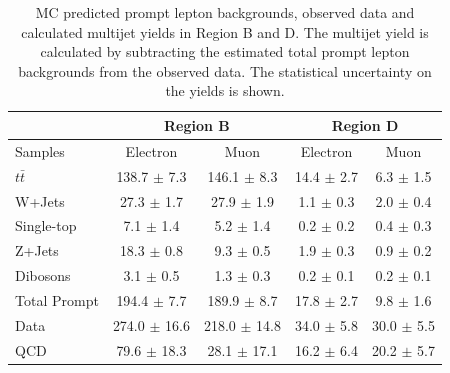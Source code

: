 \begin{table}
\begin{center}
\begin{tabular}{l|c|c||c|c}
             &\multicolumn{2}{c||}{Region B}                &\multicolumn{2}{c}{Region D} \\
\hline
Samples       & Electron               & Muon                & Electron          & Muon \\      
\hline
$t\bar{t}$    &  138.7 $\pm$ 7.3      & 146.1 $\pm$ 8.3      & 14.4 $\pm$ 2.7    & 6.3  $\pm$ 1.5  \\
W+Jets        &  27.3 $\pm$ 1.7       & 27.9 $\pm$ 1.9       & 1.1 $\pm$ 0.3    & 2.0  $\pm$ 0.4  \\        
Single-top    &  7.1  $\pm$ 1.4       & 5.2  $\pm$ 1.4     &  0.2 $\pm$ 0.2    &  0.4  $\pm$ 0.3  \\
Z+Jets        &  18.3  $\pm$ 0.8       & 9.3  $\pm$ 0.5     &  1.9 $\pm$ 0.3    &  0.9  $\pm$ 0.2  \\
Dibosons      &  3.1  $\pm$ 0.5       & 1.3  $\pm$ 0.3     &  0.2 $\pm$ 0.1    &  0.2  $\pm$ 0.1  \\
\hline
Total Prompt  &  194.4 $\pm$ 7.7      & 189.9 $\pm$ 8.7    & 17.8 $\pm$ 2.7    & 9.8  $\pm$ 1.6  \\
\hline
Data          &  274.0  $\pm$ 16.6      & 218.0   $\pm$ 14.8    & 34.0  $\pm$ 5.8   & 30.0   $\pm$ 5.5  \\
\hline
QCD           & 79.6 $\pm$ 18.3       & 28.1 $\pm$ 17.1    & 16.2 $\pm$ 6.4  & 20.2 $\pm$ 5.7 \\
\end{tabular}
\end{center}
\caption[MC predicted prompt lepton backgrounds, observed data and calculated multijet yields
in Region B and D]{MC predicted prompt lepton backgrounds, observed data and calculated multijet yields
in Region B and D. The multijet yield is calculated by subtracting the estimated total prompt lepton
backgrounds from the observed data. The statistical uncertainty on the yields is shown.}
\label{tab:boosted_region_bd_promptbkgd_data_new}
\end{table}


